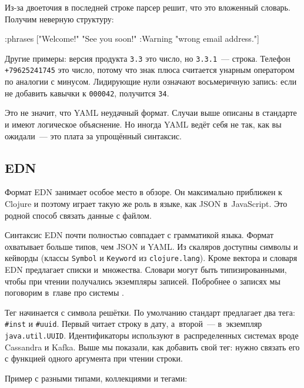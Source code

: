 Из-за двоеточия в последней строке парсер решит, что это вложенный
словарь. Получим неверную структуру:

\begin{english}
  \begin{clojure}
{:phrases ["Welcome!"
           "See you soon!"
           {:Warning "wrong email address."}]}
  \end{clojure}
\end{english}

Другие примеры: версия продукта \verb|3.3| это число, но \verb|3.3.1|~---
строка. Телефон \verb|+79625241745| это число, потому что знак плюса считается
унарным оператором по аналогии с минусом. Лидирующие нули означают восьмеричную
запись: если не добавить кавычки к \verb|000042|, получится \verb|34|.

Это не значит, что YAML неудачный формат. Случаи выше описаны в стандарте и
имеют логическое объяснение. Но иногда YAML ведёт себя не так, как вы
ожидали~--- это плата за упрощённый синтаксис.

\subsection{EDN}


Формат EDN занимает особое место в обзоре. Он максимально приближен к Clojure и
поэтому играет такую же роль в языке, как JSON в~JavaScript. Это родной способ
связать данные с файлом.

Синтаксис EDN почти полностью совпадает с грамматикой языка. Формат охватывает
больше типов, чем JSON и YAML. Из скаляров доступны символы и кейворды (классы
\verb|Symbol| и \verb|Keyword| из \verb|clojure.lang|). Кроме вектора и словаря
EDN предлагает списки и~множества. Словари могут быть типизированными, чтобы при
чтении получались экземпляры записей. Побробнее о записях мы поговорим в~главе
про системы .


Тег начинается с символа решётки. По умолчанию стандарт предлагает два тега:
\verb|#inst| и \verb|#uuid|. Первый читает строку в дату, а~второй~---
в~экземпляр \verb|java.util.UUID|. Идентификаторы используют в~распределенных
системах вроде Cassandra и Kafka. Выше мы показали, как добавить свой тег: нужно
связать его с функцией одного аргумента при чтении строки.

Пример с разными типами, коллекциями и тегами:

